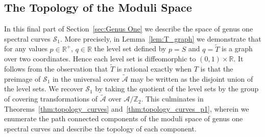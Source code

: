 \documentclass{article}
\numberwithin{equation}{section}
\numberwithin{figure}{section}
\newcommand{\bra}[1]{\left(#1\right)}
\newcommand{\Partial}[2]{\frac{\partial #1}{\partial #2}}
\newcommand{\iu}{i}
\newcommand{\Q}{\mathbb{Q}}
\newcommand{\R}{\mathbb{R}}
\begin{document}










\subsection{The Topology of the Moduli Space}\label{sub:Topology}

In this final part of Section~\ref{sec:Genus One} we describe the space of genus one spectral curves $\mathcal{S}_1$. 
More precisely,
in Lemma~\ref{lem:T_graph} we demonstrate that for any values $p \in \R^+$, $q\in\R$ the level set defined by $p = S$ and $q = \tilde{T}$ is a graph over two coordinates. 
Hence each level set is diffeomorphic to $(0,1)\times\R$.
It follows from the observation that $\tilde{T}$ is rational exactly when $T$ is that the preimage of $\mathcal{S}_1$ in the universal cover $\mathcal{\tilde{A}}$ may be written as the disjoint union of the level sets.
We recover $\mathcal{S}_1$ by taking the quotient of the level sets by the group of covering transformations of $\mathcal{\tilde{A}}$ over $\mathcal{A}/\mathbb{Z}_2$. This culminates in Theorems~\ref{thm:topology_curves} and~\ref{thm:topology_curves_p1}, wherein we enumerate the path connected components of the moduli space of genus one spectral curves and describe the topology of each component.
\end{document}
